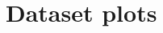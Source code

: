 \documentclass{article}
\begin{document}

\section{Dataset plots}\label{appendix:dataset_plots}





\newpage

\end{document}
